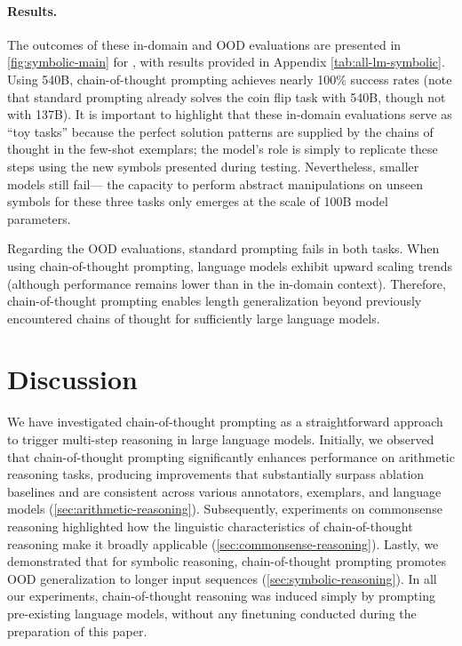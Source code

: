 \paragraph{Results.}
The outcomes of these in-domain and OOD evaluations are presented in \cref{fig:symbolic-main} for \palm{}, with \lamda{} results provided in Appendix \cref{tab:all-lm-symbolic}. Using \palm{} 540B, chain-of-thought prompting achieves nearly 100\% success rates (note that standard prompting already solves the coin flip task with \palm{} 540B, though not with \lamda{} 137B). It is important to highlight that these in-domain evaluations serve as ``toy tasks'' because the perfect solution patterns are supplied by the chains of thought in the few-shot exemplars; the model’s role is simply to replicate these steps using the new symbols presented during testing. Nevertheless, smaller models still fail— the capacity to perform abstract manipulations on unseen symbols for these three tasks only emerges at the scale of 100B model parameters.

Regarding the OOD evaluations, standard prompting fails in both tasks. When using chain-of-thought prompting, language models exhibit upward scaling trends (although performance remains lower than in the in-domain context). Therefore, chain-of-thought prompting enables length generalization beyond previously encountered chains of thought for sufficiently large language models.

\section{Discussion}\label{sec:discussion}

We have investigated chain-of-thought prompting as a straightforward approach to trigger multi-step reasoning in large language models. Initially, we observed that chain-of-thought prompting significantly enhances performance on arithmetic reasoning tasks, producing improvements that substantially surpass ablation baselines and are consistent across various annotators, exemplars, and language models (\cref{sec:arithmetic-reasoning}). Subsequently, experiments on commonsense reasoning highlighted how the linguistic characteristics of chain-of-thought reasoning make it broadly applicable (\cref{sec:commonsense-reasoning}). Lastly, we demonstrated that for symbolic reasoning, chain-of-thought prompting promotes OOD generalization to longer input sequences (\cref{sec:symbolic-reasoning}). In all our experiments, chain-of-thought reasoning was induced simply by prompting pre-existing language models, without any finetuning conducted during the preparation of this paper.


